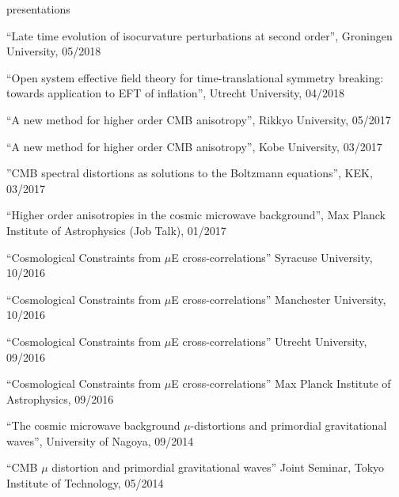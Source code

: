\documentclass[a4paper]{resume} %
\begin{document}
\begin{rSection}{presentations}
\begin{etaremune}
    \item
    ``Late time evolution of isocurvature perturbations at second order'', Groningen University, 05/2018

    \item
    ``Open system effective field theory for time-translational symmetry breaking: towards application to EFT of inflation'', Utrecht University, 04/2018

    \item
    ``A new method for higher order CMB anisotropy'', Rikkyo University, 05/2017

    \item
    ``A new method for higher order CMB anisotropy'', Kobe University, 03/2017  

    \item
    ''CMB spectral distortions as solutions to the Boltzmann equations'', KEK, 03/2017  

    \item
    ``Higher order anisotropies in the cosmic microwave background'', Max Planck Institute of Astrophysics (Job Talk), 01/2017

    \item
    ``Cosmological Constraints from $\mu$E cross-correlations'' Syracuse University, 10/2016

    \item
    ``Cosmological Constraints from $\mu$E cross-correlations'' Manchester University, 10/2016 

    \item
    ``Cosmological Constraints from $\mu$E cross-correlations'' Utrecht University, 09/2016 

    \item
``Cosmological Constraints from $\mu$E cross-correlations'' Max Planck Institute of Astrophysics, 09/2016 

    \item
``The cosmic microwave background $\mu$-distortions and primordial gravitational waves'', University of Nagoya, 09/2014 

    \item 
    ``CMB $\mu$ distortion and primordial gravitational waves'' Joint Seminar, Tokyo Institute of Technology, 05/2014
\end{etaremune}

\end{rSection}
\end{document}
